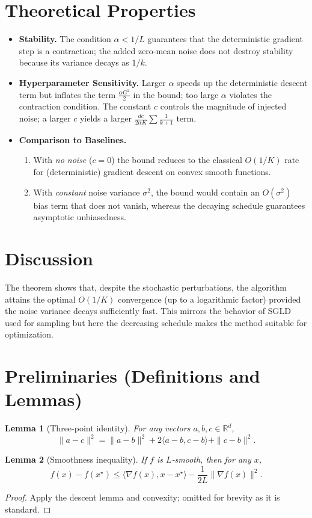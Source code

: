 \documentclass{article}
\newtheorem{lemma}{Lemma}
\begin{document}
\section*{Theoretical Properties}
\begin{itemize}
\item \textbf{Stability.} The condition $\alpha<1/L$ guarantees that the deterministic gradient step is a contraction; the added zero‑mean noise does not destroy stability because its variance decays as $1/k$.
\item \textbf{Hyperparameter Sensitivity.} Larger $\alpha$ speeds up the deterministic descent term but inflates the term $\frac{\alpha G^{2}}{2}$ in the bound; too large $\alpha$ violates the contraction condition. The constant $c$ controls the magnitude of injected noise; a larger $c$ yields a larger $\frac{d c}{2\alpha K}\sum\frac{1}{k+1}$ term.
\item \textbf{Comparison to Baselines.} 
    \begin{enumerate}
    \item With \emph{no noise} ($c=0$) the bound reduces to the classical $O(1/K)$ rate for (deterministic) gradient descent on convex smooth functions.
    \item With \emph{constant} noise variance $\sigma^{2}$, the bound would contain an $O(\sigma^{2})$ bias term that does not vanish, whereas the decaying schedule guarantees asymptotic unbiasedness.
    \end{enumerate}
\end{itemize}

\section*{Discussion}
The theorem shows that, despite the stochastic perturbations, the algorithm attains the optimal $O(1/K)$ convergence (up to a logarithmic factor) provided the noise variance decays sufficiently fast. This mirrors the behavior of SGLD used for sampling but here the decreasing schedule makes the method suitable for optimization.

\section*{Preliminaries (Definitions and Lemmas)}
\begin{lemma}[Three‑point identity]\label{lem:three}
For any vectors $a,b,c\in\mathbb{R}^{d}$,
\[
\|a-c\|^{2}= \|a-b\|^{2}+2\langle a-b,c-b\rangle+\|c-b\|^{2}.
\]
\end{lemma}
\begin{lemma}[Smoothness inequality]\label{lem:smooth}
If $f$ is $L$‑smooth, then for any $x$,
\[
f(x)-f(x^{\star})\le\langle\nabla f(x),x-x^{\star}\rangle-\frac{1}{2L}\|\nabla f(x)\|^{2}.
\]
\end{lemma}
\begin{proof}
Apply the descent lemma and convexity; omitted for brevity as it is standard.
\end{proof}
\end{document}
